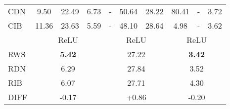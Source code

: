 \documentclass{article}
\begin{document}
\begin{table}[t]
\begin{center}
\begin{small}
\begin{sc}
\begin{tabular}{l|ccc|ccc|ccc}
CDN & 9.50 & 22.49 & 6.73 & - & 50.64 & 28.22 & 80.41 & - & 3.72 \\
CIB & 11.36 & 23.63 & 5.59 & - & 48.10 & 28.64 & 4.98 & - & 3.62\\
\midrule
& \multicolumn{3}{c|}{ReLU} & \multicolumn{3}{c|}{ReLU} & \multicolumn{3}{c}{ReLU} \\
\midrule
RWS & \multicolumn{3}{c|}{\textbf{5.42}} & \multicolumn{3}{c|}{27.22} & \multicolumn{3}{c}{\textbf{3.42}} \\
RDN & \multicolumn{3}{c|}{6.29} & \multicolumn{3}{c|}{27.84} & \multicolumn{3}{c}{3.52} \\
RIB & \multicolumn{3}{c|}{6.07} & \multicolumn{3}{c|}{27.71} & \multicolumn{3}{c}{4.30} \\
\midrule
DIFF & \multicolumn{3}{c|}{-0.17} & \multicolumn{3}{c|}{+0.86} & \multicolumn{3}{c}{-0.20} \\
\bottomrule
\end{tabular}
\end{sc}
\end{small}
\end{center}
\vskip -0.1in
\end{table}
\end{document}
